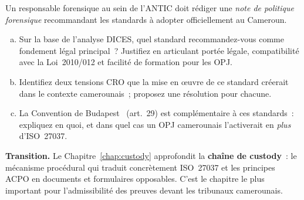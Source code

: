 \begin{boxexo}[title={\ding{45}\quad Exercice~7.3. Analyse comparative DICES \niveauexpert}]
Un responsable forensique au sein de l'ANTIC doit rédiger une
\textit{note de politique forensique} recommandant les standards à adopter
officiellement au Cameroun.
\begin{enumerate}[(a)]
    \item Sur la base de l'analyse DICES, quel standard recommandez-vous
          comme fondement légal principal~? Justifiez en articulant portée
          légale, compatibilité avec la Loi~2010/012 et facilité de
          formation pour les OPJ.
    \item Identifiez deux tensions CRO que la mise en \oe uvre de ce standard
          créerait dans le contexte camerounais~; proposez une résolution
          pour chacune.
    \item La Convention de Budapest~\cite{budapest2001} (art.~29) est complémentaire à ces
          standards~: expliquez en quoi, et dans quel cas un OPJ camerounais
          l'activerait en \emph{plus} d'ISO~27037.
\end{enumerate}
\end{boxexo}

\bigskip

\begin{boxinfo}
\textbf{Transition.} Le Chapitre~\ref{chap:custody} approfondit la
\textbf{chaîne de custody}~: le mécanisme procédural qui traduit concrètement
ISO~27037 et les principes ACPO en documents et formulaires opposables.
C'est le chapitre le plus important pour l'admissibilité des preuves
devant les tribunaux camerounais.
\end{boxinfo}